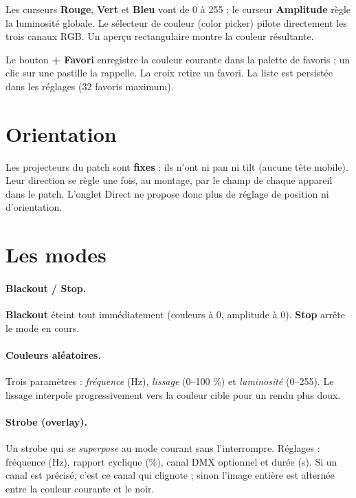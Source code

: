 Les curseurs \textbf{Rouge}, \textbf{Vert} et \textbf{Bleu} vont de 0 à 255 ;
le curseur \textbf{Amplitude} règle la luminosité globale. Le sélecteur de
couleur (color picker) pilote directement les trois canaux RGB. Un aperçu
rectangulaire montre la couleur résultante.

Le bouton \textbf{+ Favori} enregistre la couleur courante dans la palette de
favoris ; un clic sur une pastille la rappelle. La croix  retire un
favori. La liste est persistée dans les réglages (32 favoris maximum).

\section{Orientation}

Les projecteurs du patch sont \textbf{fixes} : ils n'ont ni pan ni tilt (aucune
tête mobile). Leur direction se règle une fois, au montage, par le champ
 de chaque appareil dans le patch. L'onglet Direct ne propose donc
plus de réglage de position ni d'orientation.

\section{Les modes}

\paragraph{Blackout / Stop.} \textbf{Blackout} éteint tout immédiatement
(couleurs à 0, amplitude à 0). \textbf{Stop} arrête le mode en cours.

\paragraph{Couleurs aléatoires.} Trois paramètres :
\emph{fréquence} (Hz), \emph{lissage} (0--100 \%) et \emph{luminosité}
(0--255). Le lissage interpole progressivement vers la couleur cible pour un
rendu plus doux.

\paragraph{Strobe (overlay).} Un strobe qui \emph{se superpose} au mode courant
sans l'interrompre. Réglages : fréquence (Hz), rapport cyclique (\%),
canal DMX optionnel et durée (s). Si un canal est précisé, c'est ce canal qui
clignote ; sinon l'image entière est alternée entre la couleur courante et le
noir.

